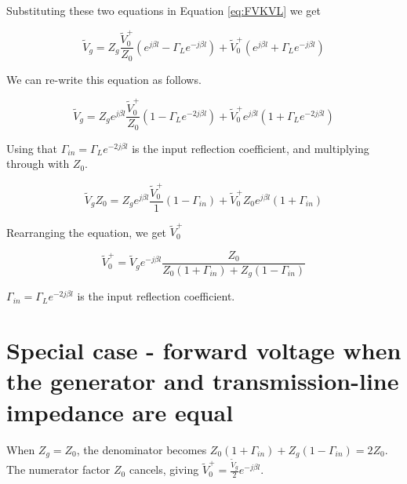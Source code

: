 \documentclass{ximera}
\begin{document}
Substituting these two equations in Equation \ref{eq:FVKVL} we get


\begin{equation}
\tilde{V}_g=Z_g \frac{\tilde{V}_0^+}{Z_0}  (e^{j \beta l} - \Gamma_L  e^{-j \beta l}  ) + \tilde{V}_0^+ (e^{j \beta l} + \Gamma_L  e^{-j \beta l } ) 
\end{equation}


We can re-write this equation as follows.



\begin{equation}
\tilde{V}_g=Z_g e^{j \beta l} \frac{\tilde{V}_0^+}{Z_0}  (1 - \Gamma_L  e^{-2j \beta l}  ) + \tilde{V}_0^+ e^{j \beta l} (1 + \Gamma_L  e^{-2j \beta l } ) 
\end{equation}

Using that 
 $\Gamma_{in} = \Gamma_L e^{-2 j \beta l} $ is the input reflection coefficient, and multiplying through with $Z_0$.


\begin{equation}
\tilde{V}_g Z_0=Z_g e^{j \beta l} \frac{\tilde{V}_0^+}{1}  (1 - \Gamma_{in} ) + \tilde{V}_0^+ Z_0 e^{j \beta l} (1 + \Gamma_{in}) 
\end{equation}


Rearranging the equation, we get $\tilde{V}_0^+$

\begin{equation}
\tilde{V}_0^+=\tilde{V}_g e^{-j \beta l} \frac{Z_0}{Z_0 (1+\Gamma_{in}) +Z_g (1-\Gamma_{in})}
\end{equation}

 $\Gamma_{in} = \Gamma_L e^{-2 j \beta l} $ is the input reflection coefficient.



\section{Special case - forward voltage when the generator and transmission-line impedance are equal}

When $Z_g=Z_0$, the denominator becomes
$Z_0(1+\Gamma_{in})+Z_g(1-\Gamma_{in})=2Z_0$.
The numerator factor $Z_0$ cancels, giving
$\tilde{V}_0^+=\frac{\tilde{V}_g}{2}e^{-j\beta l}$.
\end{document}
